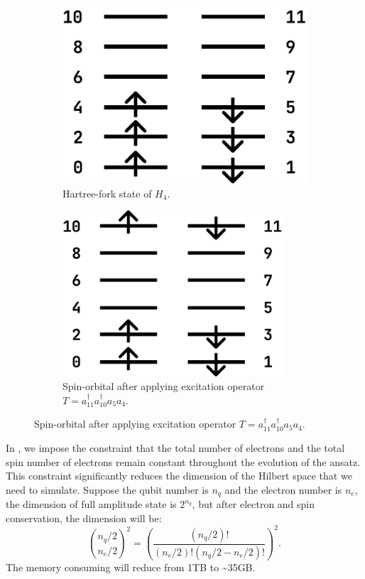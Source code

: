 \begin{figure}
    \centering
    \begin{subfigure}{0.3\textwidth}
        \centering
        \includegraphics[width=\textwidth]{images/6_1_h4_a.pdf}
        \caption{Hartree-fork state of $H_4$.}
        \label{6_1_h4_a}
    \end{subfigure}
    \begin{subfigure}{0.3\textwidth}
        \centering
        \includegraphics[width=0.9\textwidth]{images/6_1_h4_b.pdf}
        \caption{Spin-orbital after applying excitation operator $T=a_{11}^\dagger a_{10}^\dagger a_5 a_4$.}
        \label{6_1_h4_b}
    \end{subfigure}
\end{figure}

In \QuPack, we impose the constraint that the total number of electrons and the total spin number of electrons remain constant throughout the evolution of the ansatz. This constraint significantly reduces the dimension of the Hilbert space that we need to simulate. Suppose the qubit number is $n_q$ and the electron number is $n_e$, the dimension of full amplitude state is $2^{n_q}$, but after electron and spin conservation, the dimension will be:
\begin{equation}
    \binom{n_q/2}{n_e/2}^2=\left(\frac{(n_q/2)!}{(n_e/2)!(n_q/2-n_e/2)!}\right)^2.
\end{equation}
The memory consuming will reduce from 1TB to \~{}35GB.

